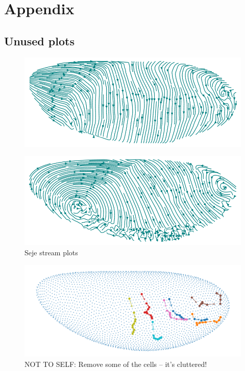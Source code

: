 \chapter*{Appendix}
\section{Unused plots}
\label{App:Plots}
\begin{figure}[H]
    \centering
    \includegraphics[width=1\linewidth]{chapters/Appendix/streamplot1.png}
\end{figure}
\begin{figure}[H]
    \centering
    \includegraphics[width=1\linewidth]{chapters/Appendix/streamplot2.png}
    \caption{Seje stream plots}
    \label{fig:enter-label}
\end{figure}

\begin{figure}[H]
    \centering
    \includegraphics[width=1\linewidth]{chapters/Results/figures/movements.png}
    \caption{NOT TO SELF: Remove some of the cells -- it's cluttered!}
    \label{fig:GBMovements}
\end{figure}

